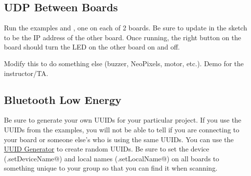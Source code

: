 \subsection{UDP Between Boards}
Run the examples \lstinline@WiFiUdpSend@ and \lstinline@WiFiUdpReceiveSend@, one 
on each of 2 boards. Be sure to update \lstinline@remoteIp@ in the 
\lstinline@WiFiUdpSend@ sketch to be the IP address of the other board. Once 
running, the right button on the \lstinline@@ board should turn the LED on 
the other board on and off.

Modify this to do something else (buzzer, NeoPixels, motor, etc.). Demo for the 
instructor/TA.

\subsection{Bluetooth Low Energy}
Be sure to generate your own UUIDs for your particular project. If you use
the UUIDs from the examples, you will not be able to tell if you are connecting
to your board or someone else's who is using the same UUIDs. You can use the 
\href{https://www.uuidgenerator.net/}{UUID Generator} to create random UUIDs.
Be sure to set the device (\lstinline@BLE.setDeviceName@) and local names 
(\lstinline@BLE.setLocalName@) on all boards to something unique to 
your group so that you can find it when scanning.

